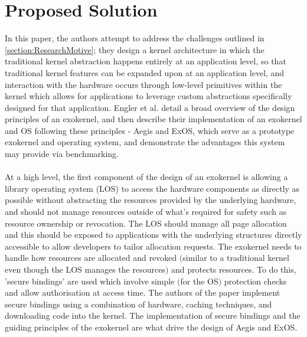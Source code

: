 \documentclass[11pt]{article}
\theoremstyle{plain}
\theoremstyle{definition}
\begin{document}
\section{Proposed Solution}\label{section:ProposedSolution}
In this paper, the authors attempt to address the challenges outlined in \ref{section:ResearchMotive}; they design a kernel architecture in which the traditional kernel abstraction happens entirely at an application level, so that traditional kernel features can be expanded upon at an application level, and interaction with the hardware occurs through low-level primitives within the kernel which allows for applications to leverage custom abstractions specifically designed for that application. Engler et al. detail a broad overview of the design principles of an exokernel, and then describe their implementation of an exokernel and OS following these principles - Aegis and ExOS, which serve as a prototype exokernel and operating system, and demonstrate the advantages this system may provide via benchmarking.\\
\\
At a high level, the first component of the design of an exokernel is allowing a library operating system (LOS) to access the hardware components as directly as possible without abstracting the resources provided by the underlying hardware, and should not manage resources outside of what's required for safety such as resource ownership or revocation. The LOS should manage all page allocation and this should be exposed to applications with the underlying structures directly accessible to allow developers to tailor allocation requests. The exokernel needs to handle how resources are allocated and revoked $($similar to a traditional kernel even though the LOS manages the resources$)$ and protects resources. To do this, 'secure bindings' are used which involve simple $($for the OS$)$ protection checks and allow authorisation at access time. The authors of the paper implement secure bindings using a combination of hardware, caching techniques, and downloading code into the kernel. The implementation of secure bindings and the guiding principles of the exokernel are what drive the design of Aegis and ExOS.
\pagebreak
\end{document}
